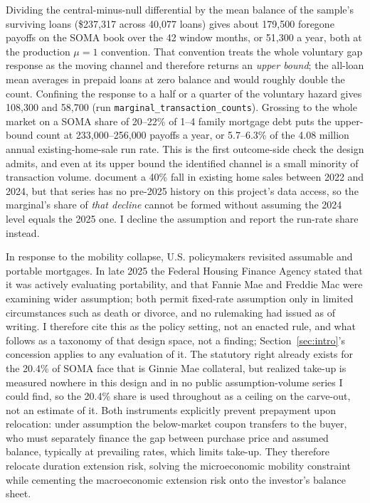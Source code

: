 Dividing the central-minus-null differential by the mean balance of the sample's surviving loans (\$237{,}317 across 40{,}077 loans) gives about 179{,}500 foregone payoffs on the SOMA book over the 42 window months, or 51{,}300 a year, both at the production $\mu = 1$ convention. That convention treats the whole voluntary gap response as the moving channel and therefore returns an \emph{upper bound}; the all-loan mean averages in prepaid loans at zero balance and would roughly double the count. Confining the response to a half or a quarter of the voluntary hazard gives 108{,}300 and 58{,}700 (run \texttt{marginal\_transaction\_counts}). Grossing to the whole market on a SOMA share of 20--22\% of 1--4 family mortgage debt puts the upper-bound count at 233{,}000--256{,}000 payoffs a year, or 5.7--6.3\% of the 4.08 million annual existing-home-sale run rate. This is the first outcome-side check the design admits, and even at its upper bound the identified channel is a small minority of transaction volume. \citet{fonseca2026} document a 40\% fall in existing home sales between 2022 and 2024, but that series has no pre-2025 history on this project's data access, so the marginal's share of \emph{that decline} cannot be formed without assuming the 2024 level equals the 2025 one. I decline the assumption and report the run-rate share instead.

In response to the mobility collapse, U.S. policymakers revisited assumable and portable mortgages. In late 2025 the Federal Housing Finance Agency stated that it was actively evaluating portability, and that Fannie Mae and Freddie Mac were examining wider assumption; both permit fixed-rate assumption only in limited circumstances such as death or divorce, and no rulemaking had issued as of writing. I therefore cite this as the policy setting, not an enacted rule, and what follows as a taxonomy of that design space, not a finding; Section~\ref{sec:intro}'s concession applies to any evaluation of it. The statutory right already exists for the 20.4\% of SOMA face that is Ginnie Mae collateral, but realized take-up is measured nowhere in this design and in no public assumption-volume series I could find, so the 20.4\% share is used throughout as a ceiling on the carve-out, not an estimate of it. Both instruments explicitly prevent prepayment upon relocation: under assumption the below-market coupon transfers to the buyer, who must separately finance the gap between purchase price and assumed balance, typically at prevailing rates, which limits take-up. They therefore relocate duration extension risk, solving the microeconomic mobility constraint while cementing the macroeconomic extension risk onto the investor's balance sheet.
